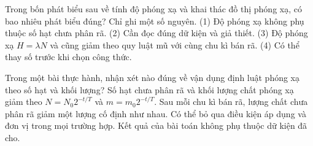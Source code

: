\begin{ex}
Trong bốn phát biểu sau về tính độ phóng xạ và khai thác đồ thị phóng xạ, có bao nhiêu phát biểu đúng? Chỉ ghi một số nguyên. (1) Độ phóng xạ không phụ thuộc số hạt chưa phân rã. (2) Cần đọc đúng dữ kiện và giả thiết. (3) Độ phóng xạ $H=\lambda N$ và cũng giảm theo quy luật mũ với cùng chu kì bán rã. (4) Có thể thay số trước khi chọn công thức.
\end{ex}

\begin{ex}
Trong một bài thực hành, nhận xét nào đúng về vận dụng định luật phóng xạ theo số hạt và khối lượng?
\choice
{\True Số hạt chưa phân rã và khối lượng chất phóng xạ giảm theo $N=N_0 2^{-t/T}$ và $m=m_0 2^{-t/T}$.}
{Sau mỗi chu kì bán rã, lượng chất chưa phân rã giảm một lượng cố định như nhau.}
{Có thể bỏ qua điều kiện áp dụng và đơn vị trong mọi trường hợp.}
{Kết quả của bài toán không phụ thuộc dữ kiện đã cho.}
\end{ex}

